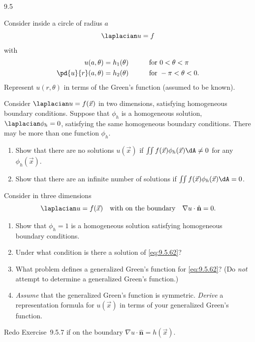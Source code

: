 \begin{exercises}{9.5}
\item Consider inside a circle of radius $a$
\[
\laplacian u = f
\]
with
\begin{alignat*}{2}
u(a,\theta) &= h_1(\theta) &\qquad& \text{for } 0 < \theta < \pi \\
\pd{u}{r}(a,\theta) &= h_2(\theta) &\qquad& \text{for } -\pi < \theta < 0.
\end{alignat*}
Represent $u(r,\theta)$ in terms of the Green's function (assumed to be known).

\item Consider $\laplacian u = f(\vec{x})$ in two dimensions, satisfying homogeneous boundary conditions.  Suppose that $\phi_h$ is a homogeneous solution, $\laplacian\phi_h = 0$, satisfying the same homogeneous boundary conditions.  There may be more than one function $\phi_h$.
\begin{enumerate}
\item[(a)] Show that there are no solutions $u(\vec{x})$ if $\iint f(\vec{x})\phi_h(\vec{x})\dA \neq 0$ for any $\phi_h(\vec{x})$.
\item[(b)] Show that there are an infinite number of solutions if $\iint f(\vec{x})\phi_h(\vec{x})\dA = 0$.
\end{enumerate}

\item Consider in three dimensions
\begin{equation}
\label{eq:9.5.62}
\laplacian u = f(\vec{x}) \quad\text{with on the boundary}\quad \nabla u\cdot\hat{\mathbf{n}} = 0.
\end{equation}
\begin{enumerate}
\item[(a)] Show that $\phi_h = 1$ is a homogeneous solution satisfying homogeneous boundary conditions.
\item[(b)] Under what condition is there a solution of \eqref{eq:9.5.62}?
\item[(c)] What problem defines a generalized Green's function for \eqref{eq:9.5.62}?  (Do \emph{not} attempt to determine a generalized Green's function.)
\item[(d)] \emph{Assume} that the generalized Green's function is symmetric.  \emph{Derive} a representation formula for $u(\vec{x})$ in terms of your generalized Green's function.
\end{enumerate}

\item Redo Exercise~9.5.7 if on the boundary $\nabla u\cdot\hat{\mathbf{n}} = h(\vec{x})$.


\end{exercises}
